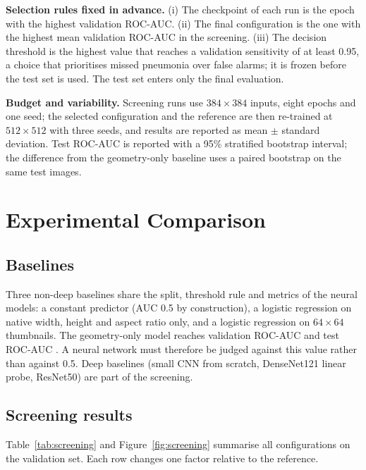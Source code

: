 \documentclass[12pt,letterpaper]{article}
\begin{document}
\textbf{Selection rules fixed in advance.} (i) The checkpoint of each run is the epoch with
the highest validation ROC-AUC. (ii) The final configuration is the one with the highest mean
validation ROC-AUC in the screening. (iii) The decision threshold is the highest value that
reaches a validation sensitivity of at least 0.95, a choice that prioritises missed pneumonia
over false alarms; it is frozen before the test set is used. The test set enters only the
final evaluation.

\textbf{Budget and variability.} Screening runs use $384\times384$ inputs, eight epochs and one
seed; the selected configuration and the reference are then re-trained at $512\times512$ with
three seeds, and results are reported as mean $\pm$ standard deviation. Test ROC-AUC is reported
with a 95\% stratified bootstrap interval; the difference from the geometry-only baseline uses a
paired bootstrap on the same test images.

\section{Experimental Comparison}
\label{sec:comparison}

\subsection{Baselines}
Three non-deep baselines share the split, threshold rule and metrics of the neural models:
a constant predictor (AUC 0.5 by construction), a logistic regression on native
width, height and aspect ratio only, and a logistic regression on $64\times64$ thumbnails.
The geometry-only model reaches validation ROC-AUC \GeomValAUC{} and test ROC-AUC
\GeomTestAUC{}. A neural network must therefore be judged against this value rather than
against 0.5. Deep baselines (small CNN from scratch, DenseNet121 linear probe, ResNet50) are
part of the screening.

\subsection{Screening results}
Table~\ref{tab:screening} and Figure~\ref{fig:screening} summarise all configurations on the
validation set. Each row changes one factor relative to the reference.

\begin{table}[htbp]
\centering
\caption{Screening on the patient-grouped validation set ($384\times384$, 8 epochs). AUC: ROC-AUC;
AP: average precision; sensitivity, specificity and balanced accuracy at the validation-selected
threshold. Bold: configuration selected for the final stage. The test set is not used here.}
\label{tab:screening}
\resizebox{\linewidth}{!}{}
\end{table}
\end{document}
